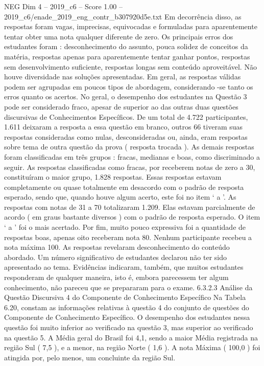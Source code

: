 \begin{textsample}{NEG Dim 4 – 2019\_c6 – Score 1.00 – 2019\_c6/enade\_2019\_eng\_contr\_b307920d5e.txt}
Em decorrência disso, as respostas foram vagas, imprecisas, equivocadas e formuladas para aparentemente tentar obter uma nota qualquer diferente de zero.
Os principais erros dos estudantes foram : desconhecimento do assunto, pouca solidez de conceitos da matéria, respostas apenas para aparentemente tentar ganhar pontos, respostas sem desenvolvimento suficiente, respostas longas sem conteúdo aproveitável.
Não houve diversidade nas soluções apresentadas.
Em geral, as respostas válidas podem ser agrupadas em poucos tipos de abordagem, considerando -se tanto os erros quanto os acertos.
No geral, o desempenho dos estudantes na Questão 3 pode ser considerado fraco, apesar de superior ao das outras duas questões discursivas de Conhecimentos Específicos.
De um total de 4.722 participantes, 1.611 deixaram a resposta a essa questão em branco, outros 66 tiveram suas respostas consideradas como nulas, desconsideradas ou, ainda, eram respostas sobre tema de outra questão da prova ( resposta trocada ).
As demais respostas foram classificadas em três grupos : fracas, medianas e boas, como discriminado a seguir.
As respostas classificadas como fracas, por receberem notas de zero a 30, constituíram o maior grupo, 1.828 respostas.
Essas respostas estavam completamente ou quase totalmente em desacordo com o padrão de resposta esperado, sendo que, quando houve algum acerto, este foi no item ‘ a ’.
As respostas com notas de 31 a 70 totalizaram 1.209.
Elas estavam parcialmente de acordo ( em graus bastante diversos ) com o padrão de resposta esperado.
O item ‘ a ’ foi o mais acertado.
Por fim, muito pouco expressiva foi a quantidade de respostas boas, apenas oito receberam nota 80.
Nenhum participante recebeu a nota máxima 100.
As respostas revelaram desconhecimento do conteúdo abordado.
Um número significativo de estudantes declarou não ter sido apresentado ao tema.
Evidências indicaram, também, que muitos estudantes responderam de qualquer maneira, isto é, embora parecessem ter algum conhecimento, não pareceu que se prepararam para o exame. 6.3.2.3 Análise da Questão Discursiva 4 do Componente de Conhecimento Específico Na Tabela 6.20, constam as informações relativas à questão 4 do conjunto de questões do Componente de Conhecimento Específico.
O desempenho dos estudantes nessa questão foi muito inferior ao verificado na questão 3, mas superior ao verificado na questão 5.
A Média geral do Brasil foi 4,1, sendo a maior Média registrada na região Sul ( 7,5 ), e a menor, na região Norte ( 1,6 ).
A nota Máxima ( 100,0 ) foi atingida por, pelo menos, um concluinte da região Sul.

\end{textsample}
